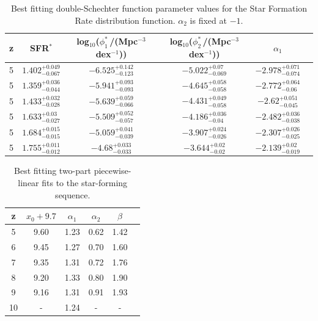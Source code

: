 \begin{table}
	\centering
	\begin{tabular}[t]{cccccc}
		\hline
		z &  SFR$^{*}$ & log$_{10}$($\phi^{*}_{1}$\,/(Mpc$^{-3}$ dex$^{-1}$)) & log$_{10}$($\phi^{*}_{2}$\,/(Mpc$^{-3}$ dex$^{-1}$)) & $\alpha_1$ \\
		\hline
		5 &            $1.402_{ - 0.067 }^{ +0.049 }$ &            $-6.525_{-0.123}^{+0.142 }$ &            $-5.022_{-0.069}^{+0.07 }$ &            $-2.978_{-0.074}^{+0.071}$ \\
		5 &            $1.359_{ - 0.044 }^{ +0.036 }$ &            $-5.941_{-0.093}^{+0.093 }$ &            $-4.645_{-0.058}^{+0.058 }$ &            $-2.772_{-0.06}^{+0.064}$ \\
		5 &            $1.433_{ - 0.028 }^{ +0.032 }$ &            $-5.639_{-0.066}^{+0.059 }$ &            $-4.431_{-0.058}^{+0.049 }$ &            $-2.62_{-0.045}^{+0.051}$ \\
		5 &            $1.633_{ - 0.027 }^{ +0.03 }$ &            $-5.509_{-0.057}^{+0.052 }$ &            $-4.186_{-0.04}^{+0.036 }$ &            $-2.482_{-0.038}^{+0.036}$ \\
		5 &            $1.684_{ - 0.015 }^{ +0.015 }$ &            $-5.059_{-0.039}^{+0.041 }$ &            $-3.907_{-0.026}^{+0.024 }$ &            $-2.307_{-0.025}^{+0.026}$ \\
		5 &            $1.755_{ - 0.012 }^{ +0.011 }$ &            $-4.68_{-0.033}^{+0.033 }$ &            $-3.644_{-0.02}^{+0.02 }$ &            $-2.139_{-0.019}^{+0.02}$ \\
		\hline
	\end{tabular}
	\caption{Best fitting double-Schechter function parameter values for the Star Formation Rate distribution function. $\alpha_{2}$ is fixed at $-1$.}
	\label{tab:sfrf_schechter_params}
\end{table}

\begin{table}
	\centering
	\begin{tabular}[t]{cccccc}
		\hline
		z & $x_{0} + 9.7$ & $\alpha_{1}$ & $\alpha_{2}$ & $\beta$ \\
		\hline
		5  & 9.60 & 1.23 & 0.62 & 1.42 \\
		6  & 9.45 & 1.27 & 0.70 & 1.60 \\
		7  & 9.35 & 1.31 & 0.72 & 1.76 \\
		8  & 9.20 & 1.33 & 0.80 & 1.90 \\
		9  & 9.16 & 1.31 & 0.91 & 1.93 \\
		10 & - & 1.24 & - & - \\
		\hline
	\end{tabular}
	\caption{Best fitting two-part piecewise-linear fits to the star-forming sequence.}
	\label{tab:sfs_params}
\end{table}


